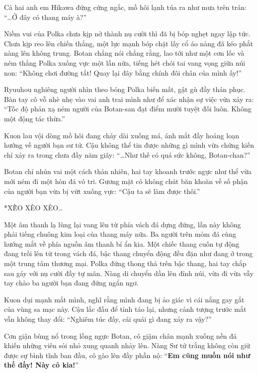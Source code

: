 \documentclass[../main.tex]{subfiles}
\begin{document}

Cả hai anh em Hikawa đứng cứng ngắc, mồ hôi lạnh túa ra như mưa trên trán: ``\dots Ở đây có thang máy à?''

Niềm vui của Polka chưa kịp nở thành nụ cười thì đã bị bóp nghẹt ngay lập tức. Chưa kịp reo lên chiến thắng, một lực mạnh bóp chặt lấy cổ áo nàng đã kéo phắt nàng lên không trung. Botan chẳng nói chẳng rằng, lao tới như một cơn lốc và ném thẳng Polka xuống vực một lần nữa, tiếng hét chói tai vang vọng giữa núi non: ``Không chơi đường tắt! Quay lại đây bằng chính đôi chân của mình ấy!''

Ryuuhou nghiêng người nhìn theo bóng Polka biến mất, gật gù đầy thán phục. Bàn tay cô vỗ nhè nhẹ vào vai anh trai mình như để xác nhận sự việc vừa xảy ra: ``Tốc độ phản xạ ném người của Botan-san đạt điểm mười tuyệt đối luôn. Không một động tác thừa.''

Kuon lau vội dòng mồ hôi đang chảy dài xuống má, ánh mắt đầy hoảng loạn hướng về người bạn sư tử. Cậu không thể tin được những gì mình vừa chứng kiến chỉ xảy ra trong chưa đầy năm giây: ``\dots Như thế có quá sức không, Botan-chan?''

Botan chỉ nhún vai một cách thản nhiên, hai tay khoanh trước ngực như thể vừa mới ném đi một hòn đá vô tri. Gương mặt cô không chút băn khoăn về số phận của người bạn vừa bị vứt xuống vực: ``Cậu ta sẽ làm được thôi.''

*XÈ̀O XÈO XÈO\dots*

Một âm thanh lạ lùng lại vang lên từ phía vách đá dựng đứng, lần này không phải tiếng chuông kim loại của thang máy nữa. Ba người trên mỏm đá cùng hướng mắt về phía nguồn âm thanh bí ẩn kia. Một chiếc thang cuốn tự động đang trồi lên từ trong vách đá, bậc thang chuyển động đều đặn như đang ở trong một trung tâm thương mại. Polka đứng thong thả trên bậc thang, hai tay chắp sau gáy với nụ cười đầy tự mãn. Nàng di chuyển dần lên đỉnh núi, vừa đi vừa vẫy tay chào ba người bạn đang đứng ngẩn ngơ.


Kuon dụi mạnh mắt mình, nghĩ rằng mình đang bị ảo giác vì cái nắng gay gắt của vùng sa mạc này. Cậu lắc đầu để tỉnh táo lại, nhưng cảnh tượng trước mắt vẫn không thay đổi: ``Nghiêm túc đấy, cái quái gì đang xảy ra vậy?''

Cơn giận bùng nổ trong lồng ngực Botan, cô giậm chân mạnh xuống nền đá khiến những viên sỏi nhỏ xung quanh nhảy lên. Nàng Sư tử trắng không còn giữ được sự bình tĩnh ban đầu, cô gào lên đầy phẫn nộ: ``\textbf{Em cũng muốn nói như thế đấy! Này cô kia!}''
\end{document}
